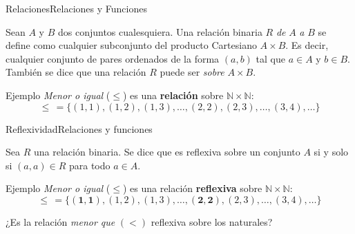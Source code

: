 \documentclass[spanish]{beamer}
\begin{document}
\begin{frame}{Relaciones}{Relaciones y Funciones}
    \begin{definition}
        Sean $A$ y $B$ dos conjuntos cualesquiera. Una \alert{relación binaria} $R$ \textit{de} $A$ \textit{a} $B$ se define como cualquier subconjunto del producto Cartesiano $A \times B$.
        Es decir, cualquier conjunto de pares ordenados de la forma $(a,b)$ tal que $a \in A$ y $b \in B$.
        También se dice que una relación $R$ puede ser \textit{sobre} $A \times B$.
    \end{definition} \pause
    \bigskip
    \begin{exampleblock}{Ejemplo}
        \textit{Menor o igual} ($\leq$) es una \textbf{relación} sobre $\mathbb{N} \times \mathbb{N}$:
        \[\leq \, = \{(1,1), (1,2), (1,3), \dots , (2,2), (2,3), \dots , (3,4), \dots \}\]
    \end{exampleblock}
\end{frame}

\begin{frame}{Reflexividad}{Relaciones y funciones}

    \begin{definition}
        Sea $R$ una relación binaria. Se dice que es \alert{reflexiva} sobre un conjunto $A$ si y solo si $(a,a) \in R$ para todo $a \in A$.
    \end{definition} \pause
    \bigskip
    \begin{exampleblock}{Ejemplo}
        \textit{Menor o igual} ($\leq$) es una relación \textbf{reflexiva} sobre $\mathbb{N} \times \mathbb{N}$:
        \[\leq \, = \{\mathbf{(1,1)}, (1,2), (1,3), \dots , \mathbf{(2,2)}, (2,3), \dots , (3,4), \dots \}\]
    \end{exampleblock} \pause
    \bigskip
    ¿Es la relación \textit{menor que} $(<)$ reflexiva sobre los naturales?
\end{frame}
\end{document}
